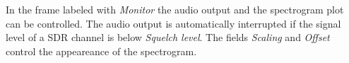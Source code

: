 \documentclass[10pt]{article}
\begin{document}
\bigskip \bigskip

In the frame labeled with \textit{Monitor} the audio output and the spectrogram plot can be controlled. The audio output is automatically interrupted if the signal level of a SDR channel is below \textit{Squelch level}. The fields \textit{Scaling} and \textit{Offset} control the appeareance of the spectrogram.

\FloatBarrier


\end{document}
